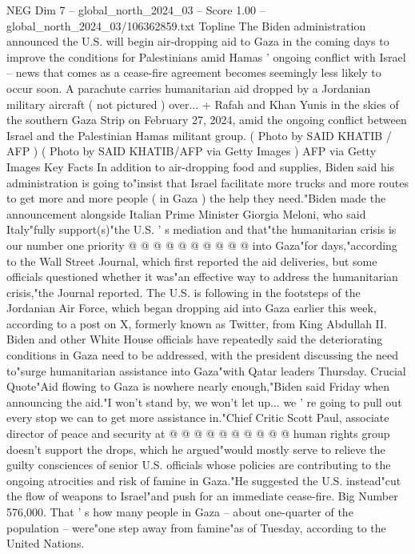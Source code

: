 \begin{textsample}{NEG Dim 7 – global\_north\_2024\_03 – Score 1.00 – global\_north\_2024\_03/106362859.txt}  \label{ex:f7_neg_425}
Topline The Biden administration announced the U.S. will begin air-dropping aid to Gaza in the coming days to improve the conditions for Palestinians amid Hamas ' ongoing conflict with Israel -- news that comes as a cease-fire agreement becomes seemingly less likely to occur soon.
A parachute carries humanitarian aid dropped by a Jordanian military aircraft ( not pictured ) over... + Rafah and Khan Yunis in the skies of the southern Gaza Strip on February 27, 2024, amid the ongoing conflict between Israel and the Palestinian Hamas militant group. ( Photo by SAID KHATIB / AFP ) ( Photo by SAID KHATIB/AFP via Getty Images ) AFP via Getty Images Key Facts In addition to air-dropping food and supplies, Biden said his administration is going to"insist that Israel facilitate more trucks and more routes to get more and more people ( in Gaza ) the help they need."Biden made the announcement alongside Italian Prime Minister Giorgia Meloni, who said Italy"fully support(s)"the U.S. ' s mediation and that"the humanitarian crisis is our number one priority @ @ @ @ @ @ @ @ @ @ into Gaza"for days,"according to the Wall Street Journal, which first reported the aid deliveries, but some officials questioned whether it was"an effective way to address the humanitarian crisis,"the Journal reported.
The U.S. is following in the footsteps of the Jordanian Air Force, which began dropping aid into Gaza earlier this week, according to a post on X, formerly known as Twitter, from King Abdullah II.
Biden and other White House officials have repeatedly said the deteriorating conditions in Gaza need to be addressed, with the president discussing the need to"surge humanitarian assistance into Gaza"with Qatar leaders Thursday.
Crucial Quote"Aid flowing to Gaza is nowhere nearly enough,"Biden said Friday when announcing the aid."I won't stand by, we won't let up... we ' re going to pull out every stop we can to get more assistance in."Chief Critic Scott Paul, associate director of peace and security at @ @ @ @ @ @ @ @ @ @ human rights group doesn't support the drops, which he argued"would mostly serve to relieve the guilty consciences of senior U.S. officials whose policies are contributing to the ongoing atrocities and risk of famine in Gaza."He suggested the U.S. instead"cut the flow of weapons to Israel"and push for an immediate cease-fire.
Big Number 576,000.
That ' s how many people in Gaza -- about one-quarter of the population -- were"one step away from famine"as of Tuesday, according to the United Nations.

\end{textsample}
